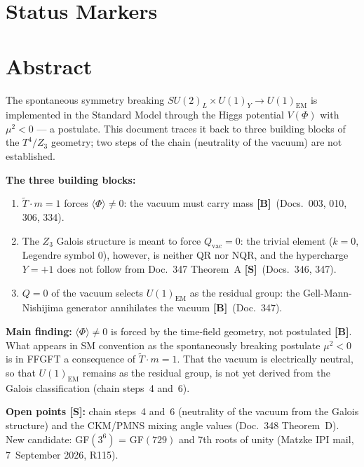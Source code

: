 \providecommand{\BM}{\textbf{[B]}}
\providecommand{\KM}{\textbf{[K]}}
\providecommand{\SM}{\textbf{[S]}}
\providecommand{\XM}{\textbf{[X]}}
\providecommand{\QM}{\textbf{[Q]}}

{}

\section*{Status Markers}


\section*{Abstract}

The spontaneous symmetry breaking $SU(2)_L\times U(1)_Y\to U(1)_\text{EM}$
is implemented in the Standard Model through the Higgs potential $V(\Phi)$
with $\mu^2<0$ --- a postulate. This document traces it back to three
building blocks of the $T^4/Z_3$ geometry; two steps of the chain
(neutrality of the vacuum) are not established.

\textbf{The three building blocks:}
\begin{enumerate}
\item $\tilde{T}\cdot m=1$ forces $\langle\Phi\rangle\neq0$: the vacuum
  must carry mass \BM\ (Docs.~003, 010, 306, 334).
\item The $Z_3$ Galois structure is meant to force $Q_\text{vac}=0$: the trivial
  element ($k=0$, Legendre symbol $0$), however, is neither QR nor NQR, and the
  hypercharge $Y=+1$ does not follow from Doc.~347 Theorem~A \SM\ (Docs.~346, 347).
\item $Q=0$ of the vacuum selects $U(1)_\text{EM}$ as the residual group:
  the Gell-Mann-Nishijima generator annihilates the vacuum \BM\ (Doc.~347).
\end{enumerate}

\textbf{Main finding:} $\langle\Phi\rangle\neq0$ is forced by the time-field
geometry, not postulated \BM. What appears in SM convention as the spontaneously
breaking postulate $\mu^2<0$ is in FFGFT a consequence of $\tilde{T}\cdot m=1$.
That the vacuum is electrically neutral, so that $U(1)_\text{EM}$ remains as the
residual group, is not yet derived from the Galois classification (chain
steps~4 and~6).

\textbf{Open points \SM:} chain steps~4 and~6 (neutrality of the vacuum from the
Galois structure) and the CKM/PMNS mixing angle values (Doc.~348 Theorem~D).
New candidate: GF$(3^6)$ = GF$(729)$ and 7th roots of unity
(Matzke IPI mail, 7~September 2026, R115).

